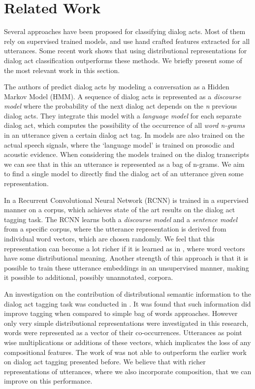 \section{Related Work}\label{sec:relwork}
Several approaches have been proposed for classifying dialog acts. Most of them rely on supervised trained models, and use hand crafted features extracted for all utterances. Some recent work shows that using distributional representations for dialog act classification outperforms these methods. We briefly present some of the most relevant work in this section.

The authors of  predict dialog acts by modeling a conversation as a Hidden Markov Model (HMM). A sequence of dialog acts is represented as a \emph{discourse model} where the probability of the next dialog act depends on the \emph{n} previous dialog acts. They integrate this model with a \emph{language model} for each separate dialog act, which computes the possibility of the occurrence of all \emph{word n-grams} in an utterance given a certain dialog act tag. In  models are also trained on the actual speech signals, where the `language model' is trained on prosodic and acoustic evidence. When considering the models trained on the dialog transcripts we can see that in this an utterance is represented as a bag of n-grams. We aim to find a single model to directly find the dialog act of an utterance given some representation.

In  a Recurrent Convolutional Neural Network (RCNN) is trained in a supervised manner on a corpus, which achieves state of the art results on the dialog act tagging task. The RCNN learns both a \emph{discourse model} and a \emph{sentence model} from a specific corpus, where the utterance representation is derived from individual word vectors, which are chosen randomly. We feel that this representation can become a lot richer if it is learned as in , where word vectors have some distributional meaning. Another strength of this approach is that it is possible to train these utterance embeddings in an unsupervised manner, making it possible to additional, possibly unannotated, corpora. 

An investigation on the contribution of distributional semantic information to the dialog act tagging task was conducted in . It was found that such information did improve tagging when compared to simple bag of words approaches. However only very simple distributional representations were investigated in this research, words were represented as a vector of their co-occurrences. Utterances as point wise multiplications or additions of these vectors, which implicates the loss of any compositional features. The work of  was not able to outperform the earlier work on dialog act tagging presented before. We believe that with richer representations of utterances, where we also incorporate composition, that we can improve on this performance.

